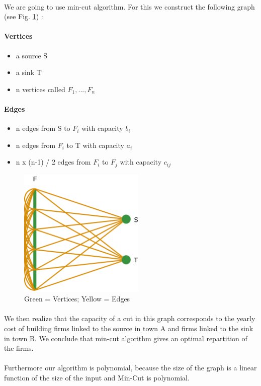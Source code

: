 \paragraph{}
We are going to use min-cut algorithm. For this we construct the following graph (see Fig. \ref{fig:Diagramme2}) :
\paragraph{Vertices}
\begin{itemize}
\item a source S
\item a sink T
\item n vertices called $F_1,...,F_n$
\end{itemize}

\paragraph{Edges}
\begin{itemize}
\item n edges from S to $F_i$ with capacity $b_i$
\item n edges from $F_i$ to T with capacity $a_i$
\item n x (n-1) / 2 edges from $F_i$ to $F_j$ with capacity $c_{ij}$
\end{itemize}

\begin{figure}[h]
	\centering
		\includegraphics[width=6cm]{Diagramme2.png}
	\caption{Green = Vertices; Yellow = Edges}
	\label{fig:Diagramme2}
\end{figure}

\paragraph{}
We then realize that the capacity of a cut in this graph corresponds to the yearly cost of building firms linked to the source in town A and firms linked to the sink in town B. We conclude that min-cut algorithm gives an optimal repartition of the firms.

\paragraph{}
Furthermore our algorithm is polynomial, because the size of the graph is a linear function of the size of the input and Min-Cut is polynomial.